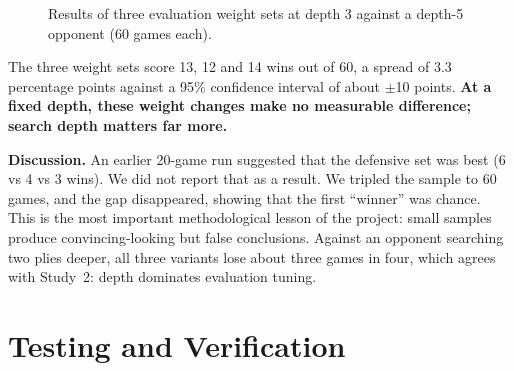 \documentclass[11pt,a4paper]{article}
\begin{document}
\begin{figure}[ht]
\centering
{}
\caption{Results of three evaluation weight sets at depth 3 against a depth-5 opponent (60 games each).}
\label{fig:weights}
\end{figure}

\begin{keybox}[title=Finding 4]
The three weight sets score 13, 12 and 14 wins out of 60, a spread of 3.3 percentage points against a 95\% confidence interval of about $\pm$10 points. \textbf{At a fixed depth, these weight changes make no measurable difference; search depth matters far more.}
\end{keybox}

\textbf{Discussion.} An earlier 20-game run suggested that the defensive set was best (6 vs 4 vs 3 wins). We did not report that as a result. We tripled the sample to 60 games, and the gap disappeared, showing that the first ``winner'' was chance. This is the most important methodological lesson of the project: small samples produce convincing-looking but false conclusions. Against an opponent searching two plies deeper, all three variants lose about three games in four, which agrees with Study~2: depth dominates evaluation tuning.

\section{Testing and Verification}\label{sec:testing}
\end{document}
